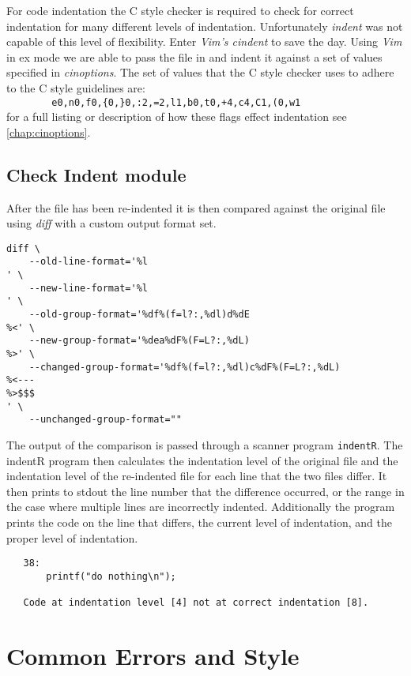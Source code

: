 For code indentation the C style checker is required to check for correct 
indentation for many different levels of indentation. Unfortunately 
\emph{indent} was not capable of this level of flexibility. Enter 
\emph{Vim's cindent} to save the day. Using \emph{Vim} in ex mode we are able 
to pass the file in and indent it against a set of values specified in 
\emph{cinoptions}. The set of values that the C style checker uses to adhere 
to the C style guidelines are:\\
\verb|        e0,n0,f0,{0,}0,:2,=2,l1,b0,t0,+4,c4,C1,(0,w1| \\
for a full listing or description of how these flags effect indentation see 
\autoref{chap:cinoptions}.
\newpage
\subsection{Check Indent module}
After the file has been re-indented it is then compared against the original 
file using \emph{diff} with a custom output format set.
\begin{verbatim}
diff \
    --old-line-format='%l
' \
    --new-line-format='%l
' \
    --old-group-format='%df%(f=l?:,%dl)d%dE
%<' \
    --new-group-format='%dea%dF%(F=L?:,%dL)
%>' \
    --changed-group-format='%df%(f=l?:,%dl)c%dF%(F=L?:,%dL)
%<---
%>$$$
' \
    --unchanged-group-format=""
\end{verbatim}

\noindent The output of the comparison is passed through a scanner program 
\texttt{indentR}. The indentR program then calculates the indentation level 
of the original file and the indentation level of the re-indented file for 
each line that the two files differ. It then prints to stdout the line number 
that the difference occurred, or the range in the case where multiple lines 
are incorrectly indented. Additionally the program prints the code on the line
that differs, the current level of indentation, and the proper level of 
indentation.
\begin{verbatim}
   38:
       printf("do nothing\n");

   Code at indentation level [4] not at correct indentation [8].
\end{verbatim}



\section{Common Errors and Style}

